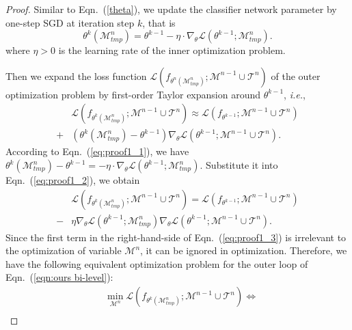 \documentclass[table, xcdraw]{article}
\theoremstyle{plain}
\theoremstyle{definition}
\theoremstyle{remark}
\begin{document}
\begin{proof}
Similar to Eqn.~(\ref{theta}), we update the classifier network parameter by one-step SGD at iteration step $k$, that is
\begin{equation}
    \theta^k(\mathcal{M}^n_{tmp}) = \theta^{k-1}-\eta \cdot \nabla_\theta \mathcal{L}(\theta^{k-1}; \mathcal{M}^n_{tmp}).
\label{eq:proof1_1}
\end{equation}
where $\eta > 0$ is the learning rate of the inner optimization problem.

Then we expand the loss function $\mathcal{L}(f_{\theta^n(\mathcal{M}^n_{tmp})};\mathcal{M}^{n-1} \cup\mathcal{T}^n)$ of the outer optimization problem by first-order Taylor expansion around $\theta^{k-1}$, \textit{i.e.},
\begin{equation}
\begin{aligned}
    & \mathcal{L}(f_{\theta^k(\mathcal{M}^n_{tmp})}; \mathcal{M}^{n-1} \cup\mathcal{T}^n)
    \approx \mathcal{L}(f_{\theta^{k-1}}; \mathcal{M}^{n-1} \cup\mathcal{T}^n) \\
    + & \left(\theta^k(\mathcal{M}^n_{tmp})-\theta^{k-1}\right)
    \nabla_\theta \mathcal{L}(\theta^{k-1}; \mathcal{M}^{n-1} \cup \mathcal{T}^n).
\label{eq:proof1_2}
\end{aligned}
\end{equation}
According to Eqn.~(\ref{eq:proof1_1}), we have $\theta^k(\mathcal{M}^n_{tmp})-\theta^{k-1}=-\eta \cdot \nabla_\theta \mathcal{L}(\theta^{k-1}; \mathcal{M}^n_{tmp})$. Substitute it into Eqn.~(\ref{eq:proof1_2}), we obtain
\begin{equation}
\begin{aligned} 
    & \mathcal{L}(f_{\theta^k(\mathcal{M}^n_{tmp})}; \mathcal{M}^{n-1} \cup\mathcal{T}^n) = \mathcal{L}(f_{\theta^{k-1}};\mathcal{M}^{n-1} \cup\mathcal{T}^n) \\
    - & \eta \nabla_\theta \mathcal{L}(\theta^{k-1}; \mathcal{M}^n_{tmp})
    \nabla_\theta \mathcal{L}(\theta^{k-1}; \mathcal{M}^{n-1} \cup \mathcal{T}^n).
\end{aligned}
\label{eq:proof1_3}
\end{equation}
Since the first term in the right-hand-side of Eqn.~(\ref{eq:proof1_3}) is irrelevant to the optimization of variable $\mathcal{M}^n$, it can be ignored in optimization. Therefore, we have the following equivalent optimization problem for the outer loop of Eqn.~(\ref{eqn:ours bi-level}):
\begin{equation}
\begin{aligned} 
          &\min_{\mathcal{M}^n}\mathcal{L}(f_{\theta^k(\mathcal{M}^n_{tmp})};\mathcal{M}^{n-1} \cup\mathcal{T}^n)\Leftrightarrow \\

\end{aligned}
\end{equation}
\end{proof}
\end{document}
